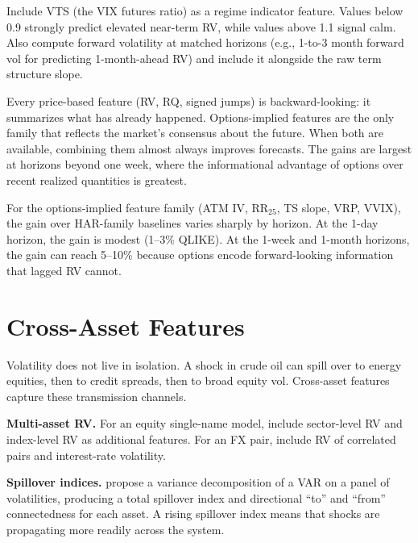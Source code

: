 \begin{projectconnection}
Include VTS (the VIX futures ratio) as a regime indicator feature.
Values below 0.9 strongly predict elevated near-term RV, while values above 1.1 signal calm.
Also compute forward volatility at matched horizons (e.g., 1-to-3 month forward vol for predicting 1-month-ahead RV) and include it alongside the raw term structure slope.
\end{projectconnection}

\begin{keyidea}
Every price-based feature (RV, RQ, signed jumps) is backward-looking: it summarizes what has already happened.
Options-implied features are the only family that reflects the market's consensus about the future.
When both are available, combining them almost always improves forecasts.
The gains are largest at horizons beyond one week, where the informational advantage of options over recent realized quantities is greatest.
\end{keyidea}

\begin{projectconnection}
For the options-implied feature family (ATM IV, RR$_{25}$, TS slope, VRP, VVIX), the gain over HAR-family baselines varies sharply by horizon. At the 1-day horizon, the gain is modest (1--3\% QLIKE). At the 1-week and 1-month horizons, the gain can reach 5--10\% because options encode forward-looking information that lagged RV cannot.
\end{projectconnection}

\section{Cross-Asset Features}\label{sec:feat-cross}

Volatility does not live in isolation.
A shock in crude oil can spill over to energy equities, then to credit spreads, then to broad equity vol.
Cross-asset features capture these transmission channels.

\textbf{Multi-asset RV.}
For an equity single-name model, include sector-level RV and index-level RV as additional features.
For an FX pair, include RV of correlated pairs and interest-rate volatility.

\textbf{Spillover indices.}
\citet{DieboldYilmaz2012} propose a variance decomposition of a VAR on a panel of volatilities, producing a total spillover index and directional ``to'' and ``from'' connectedness for each asset.
A rising spillover index means that shocks are propagating more readily across the system.


